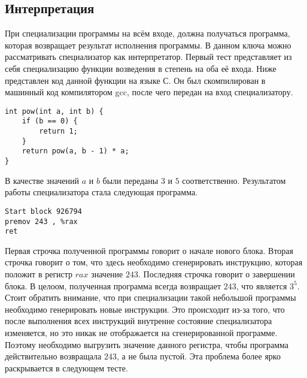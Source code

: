 \documentclass{spbau-diploma}
\begin{document}
\subsection{ Интерпретация}
При специализации программы на всём входе, должна получаться программа, которая возвращает результат исполнения программы. В данном ключа можно рассматривать специализатор как интерпретатор.
Первый тест представляет из себя специализацию функции возведения в степень на оба её входа. Ниже представлен код данной функции на языке С. Он был скомпилирован в машинный код компилятором gcc, после чего передан на вход специализатору.
\begin{lstlisting}
int pow(int a, int b) {
    if (b == 0) {
        return 1;
    }
    return pow(a, b - 1) * a;
}
\end{lstlisting}
В качестве значений $a$ и $b$ были переданы $3$ и $5$ соответственно. Результатом работы специализатора стала следующая программа.
\begin{lstlisting}
Start block 926794
premov 243 , %rax 
ret
\end{lstlisting}
Первая строчка полученной программы говорит о начале нового блока. Вторая строчка говорит о том, что здесь необходимо сгенерировать инструкцию, которая положит в регистр $rax$ значение $243$. Последняя строчка говорит о завершении блока. В целоом, полученная программа всегда возвращает $243$, что является $3^5$. Стоит обратить внимание, что при специализации такой небольшой программы необходимо генерировать новые инструкции. Это происходит из-за того, что после выполнения всех инструкций внутренне состояние специализатора изменяется, но это никак не отображается на сгенерированной программе. Поэтому необходимо выгрузить значение данного регистра, чтобы программа действительно возвращала $243$, а не была пустой. Эта проблема более ярко раскрывается в следующем тесте.
\end{document}
